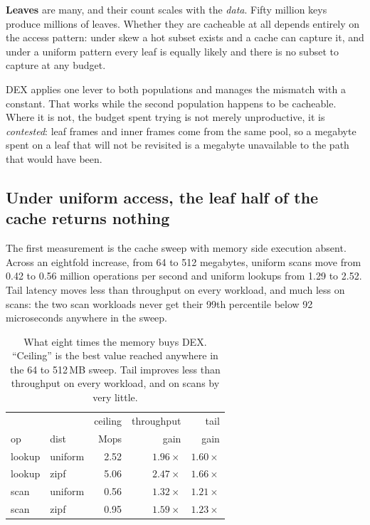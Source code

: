 \documentclass[sigconf,nonacm]{acmart}
\begin{document}
\textbf{Leaves} are many, and their count scales with the \emph{data}. Fifty
million keys produce millions of leaves. Whether they are cacheable at all
depends entirely on the access pattern: under skew a hot subset exists and a
cache can capture it, and under a uniform pattern every leaf is equally likely
and there is no subset to capture at any budget.

DEX applies one lever to both populations and manages the mismatch with a
constant. That works while the second population happens to be cacheable. Where
it is not, the budget spent trying is not merely unproductive, it is
\emph{contested}: leaf frames and inner frames come from the same pool, so a
megabyte spent on a leaf that will not be revisited is a megabyte unavailable to
the path that would have been.

\subsection{Under uniform access, the leaf half of the cache returns nothing}
\label{sec:dex:sat}

The first measurement is the cache sweep with memory side execution absent.
Across an eightfold increase, from 64 to 512 megabytes, uniform scans move from
0.42 to 0.56 million operations per second and uniform lookups from 1.29 to 2.52.
Tail latency moves less than throughput on every workload, and much less on
scans: the two scan workloads never get their 99th percentile below 92
microseconds anywhere in the sweep.

\begin{table}[t]
\centering
\small
\caption{What eight times the memory buys DEX. ``Ceiling'' is the best value
reached anywhere in the 64 to 512\,MB sweep. Tail improves less than throughput
on every workload, and on scans by very little.}
\label{tab:envelope}
\begin{tabular}{llrrr}
\toprule
 & & ceiling & throughput & tail \\
op & dist & Mops & gain & gain \\
\midrule
lookup & uniform & 2.52 & $1.96\times$ & $1.60\times$ \\
lookup & zipf    & 5.06 & $2.47\times$ & $1.66\times$ \\
scan   & uniform & 0.56 & $1.32\times$ & $1.21\times$ \\
scan   & zipf    & 0.95 & $1.59\times$ & $1.23\times$ \\
\bottomrule
\end{tabular}
\end{table}
\end{document}
